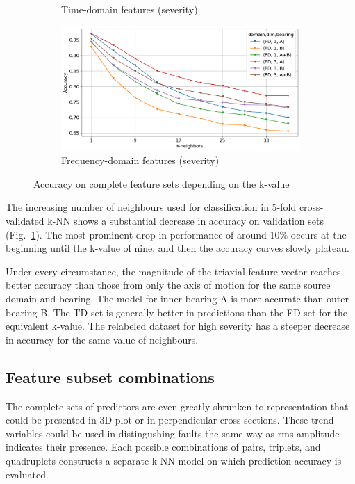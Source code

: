 \begin{figure}[h]
\begin{subfigure}[b]{0.48\textwidth}
        \caption{Time-domain features (severity)}
    \end{subfigure}
    \hfill
    \begin{subfigure}[b]{0.48\textwidth}
        \includegraphics[width=\textwidth]{assets/results/all-features/FD-severity.png}
        \caption{Frequency-domain features (severity)}
    \end{subfigure} 
    \caption{Accuracy on complete feature sets depending on the k-value}
    \label{fig:evaluation:complete-set-k-value}
\end{figure}

The increasing number of neighbours used for classification in 5-fold cross-validated k-NN shows a substantial decrease in accuracy on validation sets (Fig.~\ref{fig:evaluation:complete-set-k-value}). The most prominent drop in performance of around 10\% occurs at the beginning until the k-value of nine, and then the accuracy curves slowly plateau.

Under every circumstance, the magnitude of the triaxial feature vector reaches better accuracy than those from only the axis of motion for the same source domain and bearing. The model for inner bearing A is more accurate than outer bearing B. The TD set is generally better in predictions than the FD set for the equivalent k-value. The relabeled dataset for high severity has a steeper decrease in accuracy for the same value of neighbours.


\subsection{Feature subset combinations}
The complete sets of predictors are even greatly shrunken to representation that could be presented in 3D plot or in perpendicular cross sections. These trend variables could be used in distingushing faults the same way as rms amplitude indicates their presence. Each possible combinations of pairs, triplets, and quadruplets constructs a separate k-NN model on which prediction accuracy is evaluated. 

